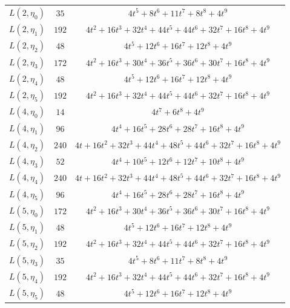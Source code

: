 \begin{center}
\begin{tabular}{c|c|c}
$L(2,\eta_{0})$ & $35$ & $4t^{5} + 8t^{6} + 11t^{7} + 8t^{8} + 4t^{9}$ \\
$L(2,\eta_{1})$ & $192$ & $4t^{2} + 16t^{3} + 32t^{4} + 44t^{5} + 44t^{6} + 32t^{7} + 16t^{8} + 4t^{9}$ \\
$L(2,\eta_{2})$ & $48$ & $4t^{5} + 12t^{6} + 16t^{7} + 12t^{8} + 4t^{9}$ \\
$L(2,\eta_{3})$ & $172$ & $4t^{2} + 16t^{3} + 30t^{4} + 36t^{5} + 36t^{6} + 30t^{7} + 16t^{8} + 4t^{9}$ \\
$L(2,\eta_{4})$ & $48$ & $4t^{5} + 12t^{6} + 16t^{7} + 12t^{8} + 4t^{9}$ \\
$L(2,\eta_{5})$ & $192$ & $4t^{2} + 16t^{3} + 32t^{4} + 44t^{5} + 44t^{6} + 32t^{7} + 16t^{8} + 4t^{9}$ \\
$L(4,\eta_{0})$ & $14$ & $4t^{7} + 6t^{8} + 4t^{9}$ \\
$L(4,\eta_{1})$ & $96$ & $4t^{4} + 16t^{5} + 28t^{6} + 28t^{7} + 16t^{8} + 4t^{9}$ \\
$L(4,\eta_{2})$ & $240$ & $4t + 16t^{2} + 32t^{3} + 44t^{4} + 48t^{5} + 44t^{6} + 32t^{7} + 16t^{8} + 4t^{9}$ \\
$L(4,\eta_{3})$ & $52$ & $4t^{4} + 10t^{5} + 12t^{6} + 12t^{7} + 10t^{8} + 4t^{9}$ \\
$L(4,\eta_{4})$ & $240$ & $4t + 16t^{2} + 32t^{3} + 44t^{4} + 48t^{5} + 44t^{6} + 32t^{7} + 16t^{8} + 4t^{9}$ \\
$L(4,\eta_{5})$ & $96$ & $4t^{4} + 16t^{5} + 28t^{6} + 28t^{7} + 16t^{8} + 4t^{9}$ \\
$L(5,\eta_{0})$ & $172$ & $4t^{2} + 16t^{3} + 30t^{4} + 36t^{5} + 36t^{6} + 30t^{7} + 16t^{8} + 4t^{9}$ \\
$L(5,\eta_{1})$ & $48$ & $4t^{5} + 12t^{6} + 16t^{7} + 12t^{8} + 4t^{9}$ \\
$L(5,\eta_{2})$ & $192$ & $4t^{2} + 16t^{3} + 32t^{4} + 44t^{5} + 44t^{6} + 32t^{7} + 16t^{8} + 4t^{9}$ \\
$L(5,\eta_{3})$ & $35$ & $4t^{5} + 8t^{6} + 11t^{7} + 8t^{8} + 4t^{9}$ \\
$L(5,\eta_{4})$ & $192$ & $4t^{2} + 16t^{3} + 32t^{4} + 44t^{5} + 44t^{6} + 32t^{7} + 16t^{8} + 4t^{9}$ \\
$L(5,\eta_{5})$ & $48$ & $4t^{5} + 12t^{6} + 16t^{7} + 12t^{8} + 4t^{9}$ \\
\hline
\end{tabular}
\end{center}
